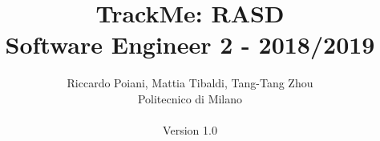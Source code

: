 \documentclass[a4paper]{article}
\begin{document}
\title{TrackMe: RASD \\Software Engineer 2 - 2018/2019}
\author{
        Riccardo Poiani, Mattia Tibaldi, Tang-Tang Zhou \\
        Politecnico di Milano\\\\ 
        Version 1.0
}
\maketitle
\newpage
\tableofcontents
{}
\newpage



\newpage



\newpage



\newpage



\newpage



\newpage
\end{document}
